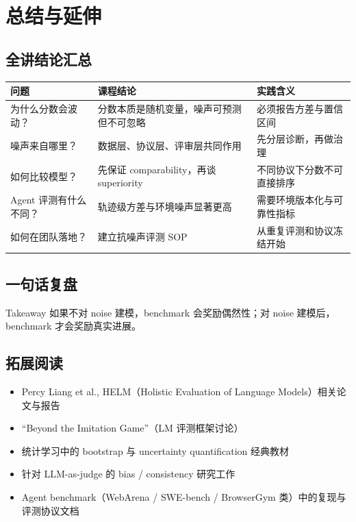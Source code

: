 \section{总结与延伸}

\subsection{全讲结论汇总}
\begin{longtable}{p{3.0cm}p{3.8cm}p{4.4cm}}
\toprule
\textbf{问题} & \textbf{课程结论} & \textbf{实践含义} \\
\midrule
为什么分数会波动？ & 分数本质是随机变量，噪声可预测但不可忽略 & 必须报告方差与置信区间 \\
噪声来自哪里？ & 数据层、协议层、评审层共同作用 & 先分层诊断，再做治理 \\
如何比较模型？ & 先保证 comparability，再谈 superiority & 不同协议下分数不可直接排序 \\
Agent 评测有什么不同？ & 轨迹级方差与环境噪声显著更高 & 需要环境版本化与可靠性指标 \\
如何在团队落地？ & 建立抗噪声评测 SOP & 从重复评测和协议冻结开始 \\
\bottomrule
\end{longtable}

\subsection{一句话复盘}
\begin{importantbox}{Takeaway}
如果不对 noise 建模，benchmark 会奖励偶然性；对 noise 建模后，benchmark 才会奖励真实进展。
\end{importantbox}

\subsection{拓展阅读}
\begin{itemize}
    \item Percy Liang et al., HELM（Holistic Evaluation of Language Models）相关论文与报告
    \item ``Beyond the Imitation Game''（LM 评测框架讨论）
    \item 统计学习中的 bootstrap 与 uncertainty quantification 经典教材
    \item 针对 LLM-as-judge 的 bias / consistency 研究工作
    \item Agent benchmark（WebArena / SWE-bench / BrowserGym 类）中的复现与评测协议文档
\end{itemize}


